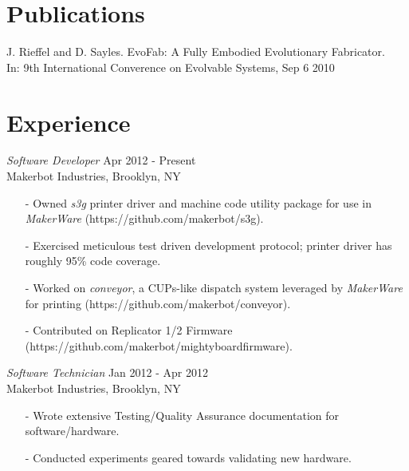 \documentclass[margin, 10pt]{res} %
\begin{document}
\begin{resume}
 
\section{Publications}
J. Rieffel and D. Sayles. EvoFab: A Fully Embodied Evolutionary Fabricator.  \\In: 9th International Converence on Evolvable Systems, Sep 6 2010 \\

 
\section{Experience}

{\sl Software Developer} \hfill Apr 2012 - Present \\
Makerbot Industries, Brooklyn, NY
\begin{itemize} \itemsep -2pt
\item[-] Owned \textit{s3g} printer driver and machine code utility package for use in \textit{MakerWare} (https://github.com/makerbot/s3g).
\item[-] Exercised meticulous test driven development protocol; printer driver has roughly 95\% code coverage.
\item[-] Worked on \textit{conveyor}, a CUPs-like dispatch system leveraged by \textit{MakerWare} for printing (https://github.com/makerbot/conveyor).
\item[-] Contributed on Replicator 1/2 Firmware \\(https://github.com/makerbot/mightyboardfirmware).
\end{itemize}

{\sl Software Technician} \hfill Jan 2012 - Apr 2012 \\
Makerbot Industries, Brooklyn, NY
\begin{itemize} \itemsep -2pt
\item[-] Wrote extensive Testing/Quality Assurance documentation for software/hardware.
\item[-] Conducted experiments geared towards validating new hardware.
\end{itemize}


\end{resume}
\end{document}
